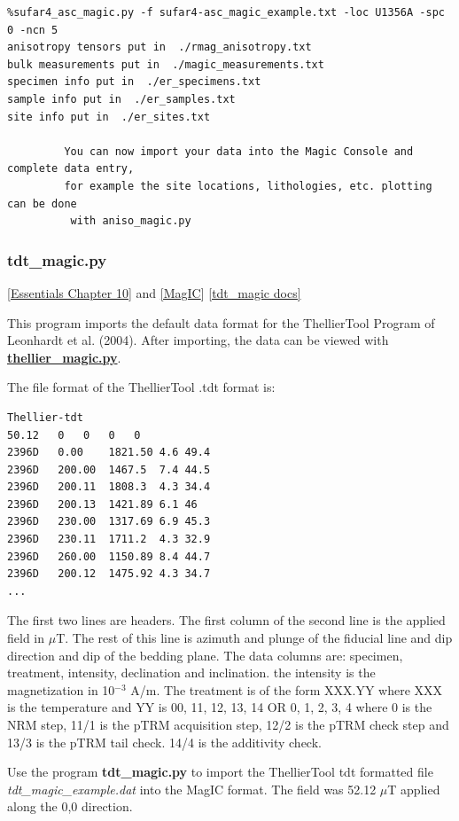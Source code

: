 \documentclass[11pt]{book}
\begin{document}
{{{{\begin{verbatim}
%sufar4_asc_magic.py -f sufar4-asc_magic_example.txt -loc U1356A -spc 0 -ncn 5
anisotropy tensors put in  ./rmag_anisotropy.txt
bulk measurements put in  ./magic_measurements.txt
specimen info put in  ./er_specimens.txt
sample info put in  ./er_samples.txt
site info put in  ./er_sites.txt

         You can now import your data into the Magic Console and complete data entry,
         for example the site locations, lithologies, etc. plotting can be done
          with aniso_magic.py
\end{verbatim}



\subsubsection{tdt\_magic.py}
\href{http://earthref.org/MAGIC/books/Tauxe/Essentials/WebBook3ch10.html#ch10}{ [Essentials Chapter 10]} and \href{#MagIC}{[MagIC}]
\href{https://github.com/PmagPy/PmagPy/blob/master/programs/tdt_magic.py}{[tdt\_magic docs]}

This program imports the default data format for the ThellierTool Program of Leonhardt et al. (2004). \nocite{leonhardt04}  After importing, the data can be viewed with \href{#thellier_magic.py}{\bf thellier\_magic.py}.

The file format of the ThellierTool  .tdt format is:
\begin{verbatim}
Thellier-tdt
50.12	0	0	0	0
2396D	0.00	1821.50	4.6	49.4
2396D	200.00	1467.5	7.4	44.5
2396D	200.11	1808.3	4.3	34.4
2396D	200.13	1421.89	6.1	46
2396D	230.00	1317.69	6.9	45.3
2396D	230.11	1711.2	4.3	32.9
2396D	260.00	1150.89	8.4	44.7
2396D	200.12	1475.92	4.3	34.7
...
\end{verbatim}
The first two lines are headers.  The first column of the second line is the applied field in $\mu$T. The rest of this line is azimuth and plunge of the fiducial line and dip direction and dip of the bedding plane.
The data columns are:
specimen, treatment, intensity,  declination and inclination.
the intensity is the magnetization in 10$^{-3}$ A/m.   The treatment is of the form XXX.YY  where XXX is the temperature and YY is   00, 11, 12, 13, 14  OR 0, 1, 2, 3, 4   where 0 is the NRM step, 11/1 is the pTRM acquisition step, 12/2 is the pTRM check step and 13/3 is the pTRM tail check.  14/4 is the additivity check.

Use the program {\bf tdt\_magic.py} to import the ThellierTool tdt formatted file  {\it tdt\_magic\_example.dat} into the MagIC format.   The field was 52.12 $\mu$T applied along the 0,0 direction.

}}}}
\end{document}
